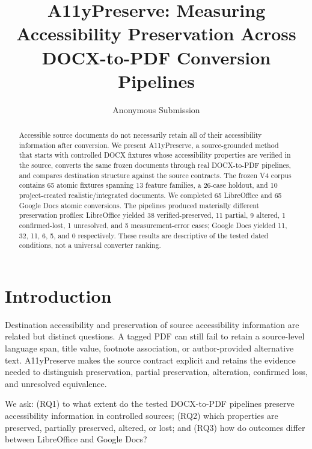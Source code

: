 \documentclass[10pt]{article}
\title{A11yPreserve: Measuring Accessibility Preservation Across DOCX-to-PDF Conversion Pipelines}
\author{Anonymous Submission}
\date{}
\begin{document}
\maketitle

\begin{abstract}
Accessible source documents do not necessarily retain all of their accessibility information after conversion. We present A11yPreserve, a source-grounded method that starts with controlled DOCX fixtures whose accessibility properties are verified in the source, converts the same frozen documents through real DOCX-to-PDF pipelines, and compares destination structure against the source contracts. The frozen V4 corpus contains 65 atomic fixtures spanning 13 feature families, a 26-case holdout, and 10 project-created realistic/integrated documents. We completed 65 LibreOffice and 65 Google Docs atomic conversions. The pipelines produced materially different preservation profiles: LibreOffice yielded 38 verified-preserved, 11 partial, 9 altered, 1 confirmed-lost, 1 unresolved, and 5 measurement-error cases; Google Docs yielded 11, 32, 11, 6, 5, and 0 respectively. These results are descriptive of the tested dated conditions, not a universal converter ranking.\end{abstract}

\section{Introduction}
Destination accessibility and preservation of source accessibility information are related but distinct questions. A tagged PDF can still fail to retain a source-level language span, title value, footnote association, or author-provided alternative text. A11yPreserve makes the source contract explicit and retains the evidence needed to distinguish preservation, partial preservation, alteration, confirmed loss, and unresolved equivalence.

We ask: (RQ1) to what extent do the tested DOCX-to-PDF pipelines preserve accessibility information in controlled sources; (RQ2) which properties are preserved, partially preserved, altered, or lost; and (RQ3) how do outcomes differ between LibreOffice and Google Docs?
\end{document}
